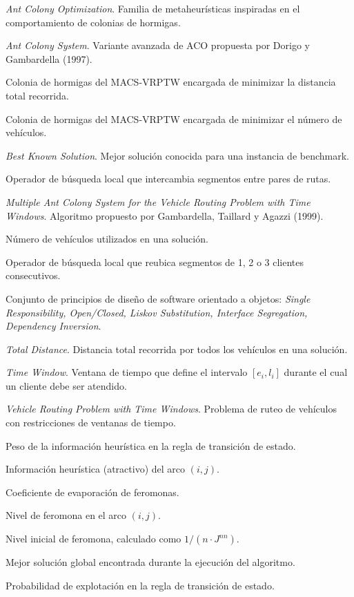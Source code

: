 \documentclass[12pt, letterpaper]{article}
\begin{document}
\begin{description}[style=nextline, leftmargin=2.5cm, font=\bfseries\color{azulUACJ}]
  \item[ACO] \textit{Ant Colony Optimization}. Familia de metaheurísticas inspiradas en el comportamiento de colonias de hormigas.
  \item[ACS] \textit{Ant Colony System}. Variante avanzada de ACO propuesta por Dorigo y Gambardella (1997).
  \item[ACS-TIME] Colonia de hormigas del MACS-VRPTW encargada de minimizar la distancia total recorrida.
  \item[ACS-VEI] Colonia de hormigas del MACS-VRPTW encargada de minimizar el número de vehículos.
  \item[BKS] \textit{Best Known Solution}. Mejor solución conocida para una instancia de benchmark.
  \item[CROSS] Operador de búsqueda local que intercambia segmentos entre pares de rutas.
  \item[MACS-VRPTW] \textit{Multiple Ant Colony System for the Vehicle Routing Problem with Time Windows}. Algoritmo propuesto por Gambardella, Taillard y Agazzi (1999).
  \item[NV] Número de vehículos utilizados en una solución.
  \item[Or-opt] Operador de búsqueda local que reubica segmentos de 1, 2 o 3 clientes consecutivos.
  \item[SOLID] Conjunto de principios de diseño de software orientado a objetos: \textit{Single Responsibility, Open/Closed, Liskov Substitution, Interface Segregation, Dependency Inversion}.
  \item[TD] \textit{Total Distance}. Distancia total recorrida por todos los vehículos en una solución.
  \item[TW] \textit{Time Window}. Ventana de tiempo que define el intervalo $[e_i, l_i]$ durante el cual un cliente debe ser atendido.
  \item[VRPTW] \textit{Vehicle Routing Problem with Time Windows}. Problema de ruteo de vehículos con restricciones de ventanas de tiempo.
  \item[$\beta$] Peso de la información heurística en la regla de transición de estado.
  \item[$\eta_{ij}$] Información heurística (atractivo) del arco $(i, j)$.
  \item[$\rho$] Coeficiente de evaporación de feromonas.
  \item[$\tau_{ij}$] Nivel de feromona en el arco $(i, j)$.
  \item[$\tau_0$] Nivel inicial de feromona, calculado como $1/(n \cdot J^{nn})$.
  \item[$\psi^{gb}$] Mejor solución global encontrada durante la ejecución del algoritmo.
  \item[$q_0$] Probabilidad de explotación en la regla de transición de estado.
\end{description}
\end{document}

